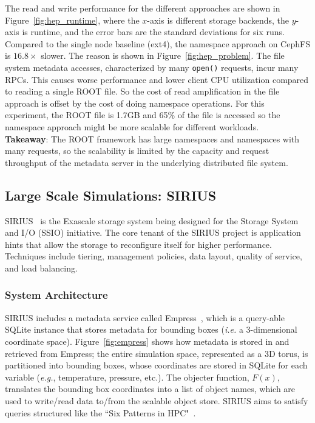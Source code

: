 
The read and write performance for the different approaches are shown in
Figure~\ref{fig:hep_runtime}, where the \(x\)-axis is different storage
backends, the \(y\)-axis is runtime, and the error bars are the standard
deviations for six runs. Compared to the single node baseline (ext4), the
namespace approach on CephFS is \(16.8\times\) slower. The reason is shown in
Figure~\ref{fig:hep_problem}. The file system metadata accesses, characterized
by many \texttt{open()} requests, incur many RPCs. This causes worse
performance and lower client CPU utilization compared to reading a single ROOT
file.  So the cost of read amplification in the file approach is offset by the
cost of doing namespace operations. For this experiment, the ROOT file is 1.7GB
and 65\% of the file is accessed so the namespace approach might be more
scalable for different workloads.\\

\noindent\textbf{Takeaway}: The ROOT framework has large namespaces and
namespaces with many requests, so the scalability is limited by the capacity
and request throughput of the metadata server in the underlying distributed
file system. 

\subsection{Large Scale Simulations: SIRIUS}

SIRIUS~\cite{klasky:journal16-sirius} is the Exascale storage system being
designed for the Storage System and I/O (SSIO) initiative. The core tenant of
the SIRIUS project is application hints that allow the storage to reconfigure
itself for higher performance. Techniques include tiering, management policies,
data layout, quality of service, and load balancing. 

\subsubsection{System Architecture}

SIRIUS includes a metadata service called Empress~\cite{lawson:pdsw17-empress},
which is a query-able SQLite instance that stores metadata for bounding boxes
({\it i.e.} a 3-dimensional coordinate space).  Figure~\ref{fig:empress} shows
how metadata is stored in and retrieved from Empress; the entire simulation
space, represented as a 3D torus, is partitioned into bounding boxes, whose
coordinates are stored in SQLite for each variable ({\it e.g.}, temperature,
pressure, etc.).  The objecter function, \(F(x)\), translates the bounding box
coordinates into a list of object names, which are used to write/read data
to/from the scalable object store. SIRIUS aims to satisfy queries structured
like the ``Six Patterns in HPC"~\cite{lofstead:hpdc11-6degrees}. 

